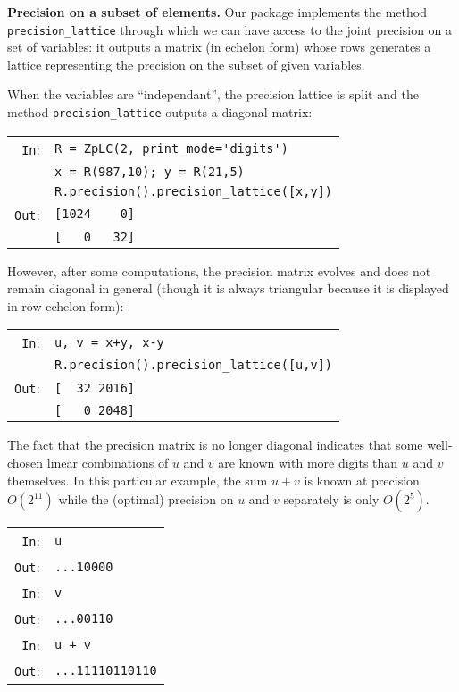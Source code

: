 \documentclass[sigconf]{acmart}
\newcommand{\cIn}{{\color{blue} \tt \phantom{Zp}In}:}
\newcommand{\cOut}{{\color{red} \tt \phantom{Z}Out}:}
\theoremstyle{definition}
\begin{document}
\noindent \textbf{Precision on a subset of elements.}
%
Our package implements the method \verb?precision_lattice? through which 
we can have access to the joint precision on a set of variables: it 
outputs a matrix (in echelon form) whose rows generates a lattice 
representing the precision on the subset of given variables.

When the variables are ``independant'', the precision lattice is
split and the method \verb?precision_lattice? outputs a diagonal
matrix:

\smallskip

\noindent
\begin{tabular}{rl}
\cIn  & \verb?R = ZpLC(2, print_mode='digits')? \\
      & \verb?x = R(987,10); y = R(21,5)? \\
      & \verb?R.precision().precision_lattice([x,y])? \\
\cOut & \verb?[1024    0]? \\
      & \verb?[   0   32]?
\end{tabular}

\smallskip

\noindent
However, after some computations, the precision matrix evolves and 
does not remain diagonal in general (though it is always triangular
because it is displayed in row-echelon form):

\smallskip

\noindent
\begin{tabular}{rl}
\cIn  & \verb?u, v = x+y, x-y? \\
      & \verb?R.precision().precision_lattice([u,v])? \\
\cOut & \verb?[  32 2016]? \\
      & \verb?[   0 2048]?
\end{tabular}

\smallskip

\noindent
The fact that the precision matrix is no longer diagonal indicates
that some well-chosen linear combinations of $u$ and $v$ are known
with more digits than $u$ and $v$ themselves. In this particular
example, the sum $u+v$ is known at precision $O(2^{11})$ while the
(optimal) precision on $u$ and $v$ separately is only $O(2^5)$.

\smallskip

\noindent
\begin{tabular}{rl}
\cIn  & \verb?u? \\
\cOut & \verb?...10000? \\
\cIn  & \verb?v? \\
\cOut & \verb?...00110? \\
\cIn  & \verb?u + v? \\
\cOut & \verb?...11110110110? \\
\end{tabular}
\end{document}
